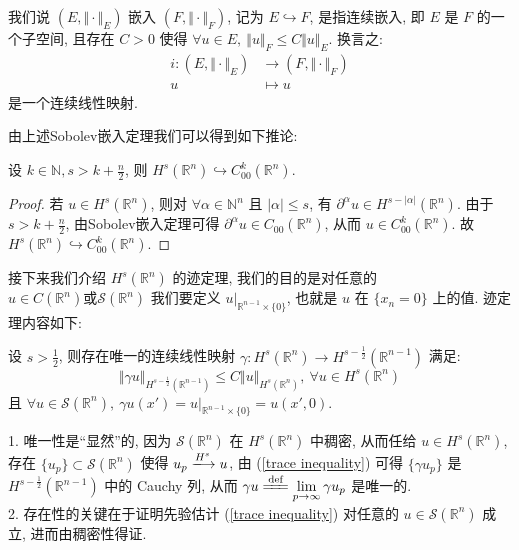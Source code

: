 \documentclass[11pt]{ctexart}[UTF8]
\begin{document}
\begin{remark}
    我们说 $(E, \Vert \cdot \Vert_{E})$ 嵌入 $(F, \Vert \cdot \Vert_{F})$, 记为 $E \hookrightarrow F$, 是指连续嵌入, 即 $E$ 是 $F$ 的一个子空间, 
    且存在 $C > 0$ 使得 $\forall u \in E,\ \Vert u \Vert_{F} \leq C\Vert u \Vert_{E}$. 换言之:
    \begin{equation*}
        \begin{aligned}
            i: (E, \Vert \cdot \Vert_{E}) &\longrightarrow (F, \Vert \cdot \Vert_{F})\\
            u &\longmapsto u
        \end{aligned}
    \end{equation*}
    是一个连续线性映射.
\end{remark}
由上述Sobolev嵌入定理我们可以得到如下推论:
\begin{corollary}
    设 $k \in \mathbb{N}, s> k + \frac{n}{2}$, 则 $H^{s}(\mathbb{R}^n) \hookrightarrow C^{k}_{00}(\mathbb{R}^n)$.
\end{corollary}
\begin{proof}
    若 $u \in H^{s}(\mathbb{R}^n)$, 则对 $\forall \alpha \in \mathbb{N}^n$ 且 $|\alpha| \leq s$, 有 $\partial^\alpha u \in H^{s-|\alpha|}(\mathbb{R}^n)$.
    由于 $s > k + \frac{n}{2}$, 由Sobolev嵌入定理可得 $\partial^\alpha u \in C_{00}(\mathbb{R}^n)$, 从而 $u \in C^{k}_{00}(\mathbb{R}^n)$.
    故 $H^{s}(\mathbb{R}^n) \hookrightarrow C^{k}_{00}(\mathbb{R}^n)$.
\end{proof}
接下来我们介绍 $H^s(\mathbb{R}^n)$ 的迹定理, 我们的目的是对任意的 $u \in C(\mathbb{R}^n)\text{或}\mathscr{S}(\mathbb{R}^n)$ 我们要定义 $u|_{\mathbb{R}^{n-1}\times \{0\}}$, 也就是 $u$ 在 $\{ x_{n} = 0 \}$ 上的值. 
迹定理内容如下:
\begin{theorem}
    设 $s > \frac{1}{2}$, 则存在唯一的连续线性映射 $\gamma: H^{s}(\mathbb{R}^n) \longrightarrow H^{s-\frac{1}{2}}(\mathbb{R}^{n-1})$ 满足:
    \begin{equation}\label{trace inequality}
        \Vert \gamma u \Vert_{H^{s-\frac{1}{2}}(\mathbb{R}^{n-1})} \leq C\Vert u \Vert_{H^{s}(\mathbb{R}^n)},\ \forall u \in H^{s}(\mathbb{R}^n)
    \end{equation}
    且 $\forall u \in \mathscr{S}(\mathbb{R}^n),\ \gamma u(x') = u|_{\mathbb{R}^{n-1}\times \{0\}} = u(x', 0)$.
\end{theorem}
\begin{remark}
    1. 唯一性是``显然''的, 因为 $\mathscr{S}(\mathbb{R}^n)$ 在 $H^s(\mathbb{R}^n)$ 中稠密, 从而任给 $u \in H^s(\mathbb{R}^n)$, 存在 $\{u_{p}\} \subset \mathscr{S}(\mathbb{R}^n)$ 
    使得 $u_{p} \xlongrightarrow{H^s} u$, 由 (\ref{trace inequality}) 可得 $\{\gamma u_{p}\}$ 是 $H^{s-\frac{1}{2}}(\mathbb{R}^{n-1})$ 中的 Cauchy 列, 
    从而 $\gamma u \xlongequal{\text{def}} \lim\limits_{p \to \infty} \gamma u_{p}$ 是唯一的.\\
    2. 存在性的关键在于证明先验估计 (\ref{trace inequality}) 对任意的 $u \in \mathscr{S}(\mathbb{R}^n)$ 成立, 进而由稠密性得证.
\end{remark}
\end{document}
